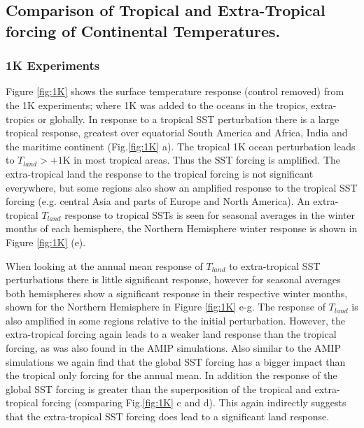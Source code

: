 \subsection{Comparison of Tropical and Extra-Tropical forcing of Continental 
Temperatures.}

\subsubsection{1K Experiments}

Figure \ref{fig:1K} shows the surface temperature response (control removed) 
from the 1K experiments; where 1K was added to the oceans in the tropics, 
extra-tropics or globally. In response to a tropical SST perturbation there is a 
large tropical response, greatest over equatorial South America and Africa, 
India and the maritime continent (Fig.\ref{fig:1K} a). The tropical 1K ocean 
perturbation leads to $T_{land}>+1$K in most tropical areas. Thus the SST 
forcing is amplified. The extra-tropical land the response to the tropical 
forcing is not significant everywhere, but some regions also show an amplified 
response to the tropical SST forcing (e.g. central Asia and parts of Europe and 
North America).  An extra-tropical $T_{land}$ response to tropical SSTs is seen 
for seasonal averages in the winter months of each hemisphere, the Northern 
Hemisphere winter response is shown in Figure \ref{fig:1K} (e).

When looking at the annual mean response of $T_{land}$ to extra-tropical SST 
perturbations there is little significant response, however for seasonal 
averages both hemispheres show a significant response in their respective winter 
months, shown for the Northern Hemisphere in Figure \ref{fig:1K} e-g. The 
response of $T_{land}$ is also amplified in some regions relative to the initial 
perturbation.  However, the extra-tropical forcing again leads to a weaker land 
response than the tropical forcing, as was also found in the AMIP simulations.  
Also similar to the AMIP simulations we again find that the  global SST forcing 
has a bigger impact than the tropical only forcing for the annual mean. In 
addition the response of the global SST forcing is greater than the 
superposition of the tropical and extra-tropical forcing (comparing 
Fig.\ref{fig:1K} c and d).  This again indirectly suggests that the 
extra-tropical SST forcing does lead to a significant land response.

